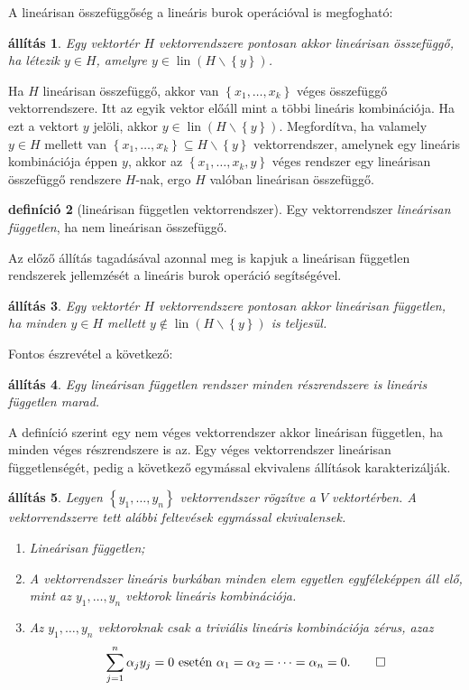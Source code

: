 \documentclass[a4paper, showtrims]{memoir}
\makeatletter
\renewenvironment{proof}[1][\proofname]
    {\par\pushQED{\qed}%
    \normalfont \topsep6\p@\@plus6\p@\relax
    \trivlist
    \item[\hskip\labelsep
        \itshape
    #1\@addpunct{:}]\ignorespaces}
    {\popQED\endtrivlist\@endpefalse}
\theoremstyle{plain}
\newtheorem{proposition}{állítás}[chapter]
\theoremstyle{remark}
\theoremstyle{definition}
\newtheorem{definition}[proposition]{definíció}
\DeclareMathOperator{\lin}{lin}
\makeatother
\begin{document}
A lineárisan összefüggőség a lineáris burok operációval is megfogható:
\begin{proposition}
    Egy vektortér $H$ vektorrendszere pontosan akkor lineárisan összefüggő, ha létezik $y\in H$, amelyre $y\in\lin(H\smallsetminus\left\{ y \right\})$.
\end{proposition}
\begin{proof}
    Ha $H$ lineárisan összefüggő, akkor van $\left\{ x_1,\ldots,x_k \right\}$ véges összefüggő vektorrendszere.
    Itt az egyik vektor előáll mint a többi lineáris kombinációja. 
    Ha ezt a vektort $y$ jelöli, akkor $y\in\lin\left( H\smallsetminus\left\{ y \right\} \right)$.
    Megfordítva, ha valamely $y\in H$ mellett van $\left\{ x_1,\ldots,x_k \right\}\subseteq H\smallsetminus\left\{ y \right\}$ vektorrendszer, amelynek egy lineáris kombinációja éppen $y$, 
    akkor az $\left\{ x_1,\ldots,x_k,y \right\}$ véges rendszer egy lineárisan összefüggő rendszere $H$-nak, ergo $H$ valóban lineárisan összefüggő.
\end{proof}
\begin{definition}[lineárisan független vektorrendszer]
	Egy vektorrendszer \emph{lineárisan független}, ha nem lineárisan összefüggő.
\end{definition}
Az előző állítás tagadásával azonnal meg is kapjuk a lineárisan független rendszerek jellemzését
a lineáris burok operáció segítségével.
\begin{proposition}
    Egy vektortér $H$ vektorrendszere pontosan akkor lineárisan független, ha minden $y\in H$ mellett $y\notin\lin(H\smallsetminus\left\{ y \right\})$ is teljesül.
\end{proposition}
Fontos észrevétel a következő:
\begin{proposition}
    Egy lineárisan független rendszer minden részrendszere is lineáris független marad.
\end{proposition}
A definíció szerint egy nem véges vektorrendszer akkor lineárisan független, ha minden véges részrendszere is az.
Egy véges vektorrendszer lineárisan függetlenségét, pedig a következő egymással ekvivalens állítások karakterizálják.
\begin{proposition}
	Legyen $\left\{ y_1,\ldots,y_n \right\}$ vektorrendszer rögzítve a $V$ vektortérben.
	A vektorrendszerre tett alábbi feltevések egymással ekvivalensek.
	\begin{enumerate}
		\item Lineárisan független;
		\item A vektorrendszer lineáris burkában minden elem egyetlen egyféleképpen áll elő,
		      mint az $y_1,\ldots,y_n$ vektorok lineáris kombinációja.
		\item Az $y_1,\ldots,y_n$ vektoroknak csak a \emph{triviális lineáris kombinációja} zérus,
		      azaz
		      \[
			      \sum_{j=1}^n\alpha_jy_j=0\text{ esetén }\alpha_1=\alpha_2=\dots=\alpha_n=0.\qedhere
		      \]
	\end{enumerate}
\end{proposition}
\end{document}
